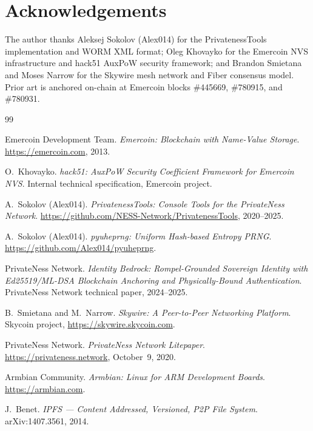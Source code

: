 \documentclass[11pt,a4paper]{article}
\theoremstyle{definition}
\begin{document}
\section*{Acknowledgements}

The author thanks Aleksej Sokolov (Alex014) for the PrivatenessTools
implementation and WORM XML format; Oleg Khovayko for the Emercoin NVS
infrastructure and hack51 AuxPoW security framework; and Brandon Smietana
and Moses Narrow for the Skywire mesh network and Fiber consensus model.
Prior art is anchored on-chain at Emercoin blocks \#445669, \#780915,
and \#780931.

\begin{thebibliography}{99}

Emercoin Development Team.
\textit{Emercoin: Blockchain with Name-Value Storage}.
\url{https://emercoin.com}, 2013.

O.~Khovayko.
\textit{hack51: AuxPoW Security Coefficient Framework for Emercoin NVS}.
Internal technical specification, Emercoin project.

A.~Sokolov (Alex014).
\textit{PrivatenessTools: Console Tools for the PrivateNess Network}.
\url{https://github.com/NESS-Network/PrivatenessTools}, 2020--2025.

A.~Sokolov (Alex014).
\textit{pyuheprng: Uniform Hash-based Entropy PRNG}.
\url{https://github.com/Alex014/pyuheprng}.

PrivateNess Network.
\textit{Identity Bedrock: Rompel-Grounded Sovereign Identity with
Ed25519/ML-DSA Blockchain Anchoring and Physically-Bound Authentication}.
PrivateNess Network technical paper, 2024--2025.

B.~Smietana and M.~Narrow.
\textit{Skywire: A Peer-to-Peer Networking Platform}.
Skycoin project, \url{https://skywire.skycoin.com}.

PrivateNess Network.
\textit{PrivateNess Network Litepaper}.
\url{https://privateness.network}, October~9, 2020.

Armbian Community.
\textit{Armbian: Linux for ARM Development Boards}.
\url{https://armbian.com}.

J.~Benet.
\textit{IPFS --- Content Addressed, Versioned, P2P File System}.
arXiv:1407.3561, 2014.


\end{thebibliography}
\end{document}
